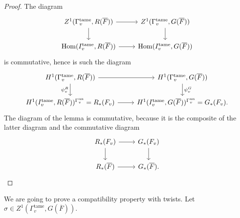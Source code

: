 \documentclass[a4paper,english,12pt]{amsart}
\newcommand{\RR}{\mathbb{R}}
\newcommand{\oF}{\overline F}
\DeclareMathOperator{\Hom}{Hom}
\DeclareMathOperator{\un}{un}
\DeclareMathOperator{\tame}{{tame}}
\numberwithin{equation}{subsection}
\begin{document}
\begin{proof}
The diagram 
\[\begin{tikzcd}
	{Z^1(\Gamma_v^{\tame}, R(\oF))} & {Z^1(\Gamma_v^{\tame},G(\oF))} \\
	{\Hom(I_v^{\tame}, R(\oF))} & {\Hom(I_v^{\tame}, G(\oF))}
	\arrow[from=2-1, to=2-2]
	\arrow[from=1-2, to=2-2]
	\arrow[from=1-1, to=1-2]
	\arrow[from=1-1, to=2-1]
\end{tikzcd}\]
is commutative, hence is such the diagram
\[\begin{tikzcd}
	{H^1(\Gamma^{\tame}_v,R(\overline F))} & {H^1(\Gamma^{\tame}_v, G(\overline F))} \\
	{H^1(I_v^{\tame}, R(\oF))^{\Gamma_v^{\un}}=R_*( F_v)} & {H^1(I_v^{\tame}, G(\oF))^{\Gamma_v^{\un}}=G_*(F_v).}
	\arrow["{}"', from=2-1, to=2-2]
	\arrow["{\psi^G_v}", from=1-2, to=2-2]
	\arrow[from=1-1, to=1-2]
	\arrow["{\psi^R_v}"', from=1-1, to=2-1]
\end{tikzcd}\]
The diagram of the lemma is commutative, because it is the composite of the latter diagram and the commutative diagram
\[\begin{tikzcd}
	{R_*(F_v)} & {G_*(F_v)} \\
	{R_*(\overline F)} & {G_*(\overline F).}
	\arrow[from=2-1, to=2-2]
	\arrow[from=1-2, to=2-2]
	\arrow[from=1-1, to=1-2]
	\arrow[from=1-1, to=2-1]
\end{tikzcd}\]
\end{proof}
We are going to prove a compatibility property with twists. %
Let $\sigma\in Z^1(\Gamma_v^{\tame}, G(\oF))$. %
\end{document}
